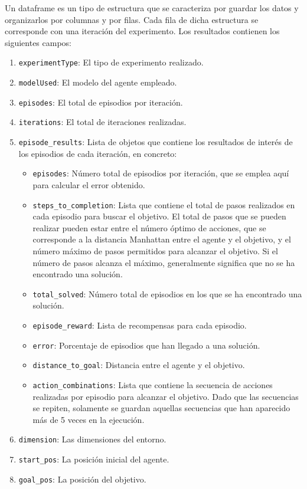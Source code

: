 Un dataframe es un tipo de estructura que se caracteriza por guardar los datos y organizarlos por columnas y por filas. Cada fila de dicha estructura se corresponde con una iteración del experimento. Los resultados contienen los siguientes campos: 
\begin{enumerate}
    \item \texttt{experimentType}: El tipo de experimento realizado. 
    \item \texttt{modelUsed}: El modelo del agente empleado.
    \item \texttt{episodes}: El total de episodios por iteración.
    \item \texttt{iterations}: El total de iteraciones realizadas. 
    \item \texttt{episode\_results}: Lista de objetos que contiene los resultados de interés de los episodios de cada iteración, en concreto:
    \begin{itemize}
        \item \texttt{episodes}: Número total de episodios por iteración, que se emplea aquí para calcular el error obtenido.
        \item \texttt{steps\_to\_completion}: Lista que contiene el total de pasos realizados en cada episodio para buscar el objetivo. El total de pasos que se pueden realizar pueden estar entre el número óptimo de acciones, que se corresponde a la distancia Manhattan entre el agente y el objetivo, y el número máximo de pasos permitidos para alcanzar el objetivo. Si el número de pasos alcanza el máximo, generalmente significa que no se ha encontrado una solución. 
        \item \texttt{total\_solved}: Número total de episodios en los que se ha encontrado una solución.
        \item \texttt{episode\_reward}: Lista de recompensas para cada episodio.
        \item \texttt{error}: Porcentaje de episodios que han llegado a una solución.
        \item \texttt{distance\_to\_goal}: Distancia entre el agente y el objetivo. 
        \item \texttt{action\_combinations}: Lista que contiene la secuencia de acciones realizadas por episodio para alcanzar el objetivo. Dado que las secuencias se repiten, solamente se guardan aquellas secuencias que han aparecido más de 5 veces en la ejecución. 
    \end{itemize}
    \item \texttt{dimension}: Las dimensiones del entorno. 
    \item \texttt{start\_pos}: La posición inicial del agente.
    \item \texttt{goal\_pos}: La posición del objetivo. 
\end{enumerate}

